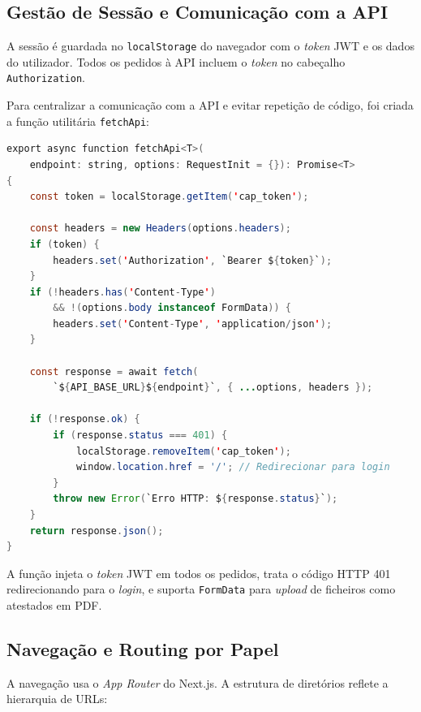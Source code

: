 \subsection{Gestão de Sessão e Comunicação com a API}

A sessão é guardada no \texttt{localStorage} do navegador com o \textit{token} JWT e os dados do utilizador. Todos os pedidos à API incluem o \textit{token} no cabeçalho \texttt{Authorization}.

Para centralizar a comunicação com a API e evitar repetição de código, foi criada a função utilitária \texttt{fetchApi}:

\begin{lstlisting}[language=Java,basicstyle=\ttfamily\small,breaklines=true,frame=single,caption={Função utilitária \texttt{fetchApi} para comunicação com a API REST.},label={lst:fetchapi}]
export async function fetchApi<T>(
    endpoint: string, options: RequestInit = {}): Promise<T>
{
    const token = localStorage.getItem('cap_token');

    const headers = new Headers(options.headers);
    if (token) {
        headers.set('Authorization', `Bearer ${token}`);
    }
    if (!headers.has('Content-Type')
        && !(options.body instanceof FormData)) {
        headers.set('Content-Type', 'application/json');
    }

    const response = await fetch(
        `${API_BASE_URL}${endpoint}`, { ...options, headers });

    if (!response.ok) {
        if (response.status === 401) {
            localStorage.removeItem('cap_token');
            window.location.href = '/'; // Redirecionar para login
        }
        throw new Error(`Erro HTTP: ${response.status}`);
    }
    return response.json();
}
\end{lstlisting}

A função injeta o \textit{token} JWT em todos os pedidos, trata o código HTTP 401 redirecionando para o \textit{login}, e suporta \texttt{FormData} para \textit{upload} de ficheiros como atestados em PDF.

\subsection{Navegação e Routing por Papel}

A navegação usa o \textit{App Router} do Next.js. A estrutura de diretórios reflete a hierarquia de URLs:

